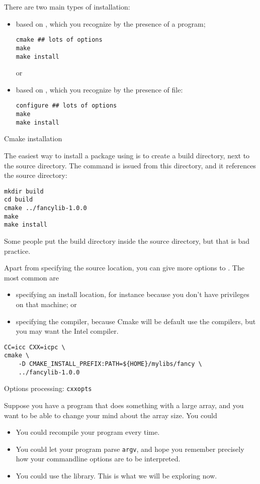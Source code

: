 There are two main types of installation:
\begin{itemize}
\item based on
  ,
  which you recognize by the presence of a  program;
\begin{verbatim}
cmake ## lots of options
make 
make install
\end{verbatim}
or
\item based on ,
  which you recognize by the presence of  file:
\begin{verbatim}
configure ## lots of options
make 
make install
\end{verbatim}
\end{itemize}

 {Cmake installation}

The easiest way to install a package using  is to create a build directory,
next to the source directory. The  command is issued from this directory,
and it references the source directory:
\begin{verbatim}
mkdir build
cd build
cmake ../fancylib-1.0.0
make 
make install
\end{verbatim}
Some people put the build directory inside the source directory,
but that is bad practice.

Apart from specifying the source location,
you can give more options to .
The most common are
\begin{itemize}
\item specifying an install location, for instance because you don't have 
  privileges on that machine; or
\item specifying the compiler, because Cmake will be default use the 
  compilers, but you may want the Intel compiler.
\end{itemize}
\begin{verbatim}
CC=icc CXX=icpc \
cmake \
    -D CMAKE_INSTALL_PREFIX:PATH=${HOME}/mylibs/fancy \
    ../fancylib-1.0.0
\end{verbatim}



 {Options processing: \texttt{cxxopts}}
\label{sec:cxxoptlib}

Suppose you have a program that does something with a large array,
and you want to be able to change your mind about the array size.
You could
\begin{itemize}
\item You could recompile your program every time.
\item You could let your program parse \lstinline{argv}, and hope
  you remember precisely how your commandline options are to be interpreted.
\item You could use the \indextermtt{cxxopts} library.
  This is what we will be exploring now.
\end{itemize}

